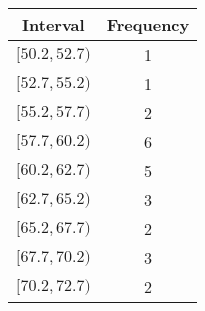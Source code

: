 \begin{tabular}{c c}
  \hline
  Interval & Frequency \\
  \hline
  $[50.2, 52.7)$ & 1 \\
  $[52.7, 55.2)$ & 1 \\
  $[55.2, 57.7)$ & 2 \\
  $[57.7, 60.2)$ & 6 \\
  $[60.2, 62.7)$ & 5 \\
  $[62.7, 65.2)$ & 3 \\
  $[65.2, 67.7)$ & 2 \\
  $[67.7, 70.2)$ & 3 \\
  $[70.2, 72.7)$ & 2 \\
  \hline
\end{tabular}
